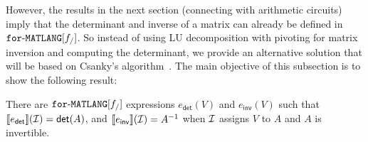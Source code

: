However, the results
in the next section (connecting \langfor with arithmetic circuits) imply that the determinant
and inverse of a matrix can already be defined in $\texttt{for}\text{-}\texttt{MATLANG}[f_/]$. So instead of using LU decomposition with pivoting for matrix inversion and computing the determinant, we provide an alternative solution that will be based on Csanky's algorithm~\cite{Csanky76}. The main objective of this subsection is to show the following result:

\begin{proposition}\label{prop:inverse}
    There are $\texttt{for}\text{-}\texttt{MATLANG}[f_/]$ expressions $e_{\mathsf{det}}(V)$ and $e_{\mathsf{inv}}(V)$ such that
    $\llbracket e_{\mathsf{det}} \rrbracket(\mathcal{I})=\mathsf{det}(A)$, and  
    $\llbracket e_{\mathsf{inv}} \rrbracket(\mathcal{I})=A^{-1}$ when $\mathcal{I}$ assigns $V$
    to $A$ and $A$ is invertible.
\end{proposition}



